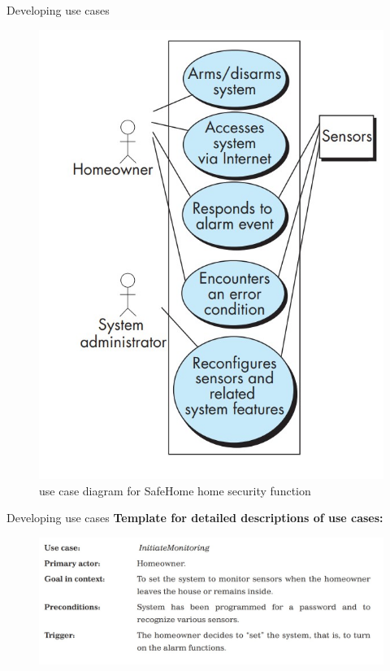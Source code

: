 \documentclass{beamer}
\begin{document}
\begin{frame}{Developing use cases}

	\begin{figure}
		\includegraphics[scale=.4]{img/m2_16.jpg}
		\caption{use case 
			diagram for 
			SafeHome 
			home security 
			function }
	\end{figure}
\end{frame}
\begin{frame}{Developing use cases}
	\textbf{Template for detailed descriptions of use cases:}
		\begin{figure}
		\includegraphics[scale=.4]{img/m2_17.jpg}
	\end{figure}
\end{frame}
\end{document}
